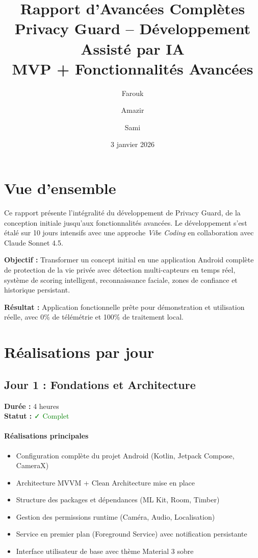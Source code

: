 \documentclass[11pt,a4paper]{article}
\title{\textbf{Rapport d'Avancées Complètes}\\
\large Privacy Guard -- Développement Assisté par IA\\
\large MVP + Fonctionnalités Avancées}
\author{Farouk \and Amazir \and Sami}
\date{3 janvier 2026}
\begin{document}
\maketitle

\section{Vue d'ensemble}

Ce rapport présente l'intégralité du développement de Privacy Guard, de la conception initiale jusqu'aux fonctionnalités avancées. Le développement s'est étalé sur 10 jours intensifs avec une approche \emph{Vibe Coding} en collaboration avec Claude Sonnet 4.5.

\vspace{2mm}
\noindent\textbf{Objectif :} Transformer un concept initial en une application Android complète de protection de la vie privée avec détection multi-capteurs en temps réel, système de scoring intelligent, reconnaissance faciale, zones de confiance et historique persistant.

\vspace{2mm}
\noindent\textbf{Résultat :} Application fonctionnelle prête pour démonstration et utilisation réelle, avec 0\% de télémétrie et 100\% de traitement local.

\section{Réalisations par jour}

\subsection{Jour 1 : Fondations et Architecture}

\textbf{Durée :} 4 heures \\
\textbf{Statut :} \textcolor{green}{✓ Complet}

\paragraph{Réalisations principales}
\begin{itemize}
    \item Configuration complète du projet Android (Kotlin, Jetpack Compose, CameraX)
    \item Architecture MVVM + Clean Architecture mise en place
    \item Structure des packages et dépendances (ML Kit, Room, Timber)
    \item Gestion des permissions runtime (Caméra, Audio, Localisation)
    \item Service en premier plan (Foreground Service) avec notification persistante
    \item Interface utilisateur de base avec thème Material 3 sobre
\end{itemize}
\end{document}
